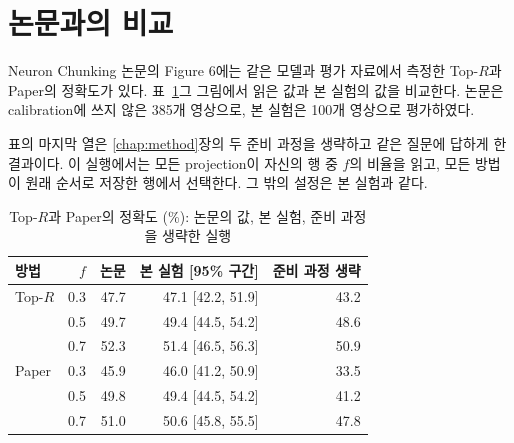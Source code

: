 
\section{논문과의 비교}\label{sec:exp-paper}

Neuron Chunking 논문의 Figure 6에는 같은 모델과 평가 자료에서 측정한 Top-$R$과 Paper의 정확도가 있다. 표~\ref{tab:paper}\는 그 그림에서 읽은 값과 본 실험의 값을 비교한다. 논문은 calibration에 쓰지 않은 385개 영상으로, 본 실험은 100개 영상으로 평가하였다.

표의 마지막 열은 \ref{chap:method}장의 두 준비 과정을 생략하고 같은 질문에 답하게 한 결과이다. 이 실행에서는 모든 projection이 자신의 행 중 $f$의 비율을 읽고, 모든 방법이 원래 순서로 저장한 행에서 선택한다. 그 밖의 설정은 본 실험과 같다.

\begin{table}[htbp]
    \centering
    \caption{Top-$R$과 Paper의 정확도 (\%): 논문의 값, 본 실험, 준비 과정을 생략한 실행}
    \label{tab:paper}
    \begin{tabular}{lrrrr}
        \toprule
        방법 & $f$ & 논문 & 본 실험 [95\% 구간] & 준비 과정 생략 \\
        \midrule
        Top-$R$ & 0.3 & 47.7 & 47.1 [42.2, 51.9] & 43.2 \\
                & 0.5 & 49.7 & 49.4 [44.5, 54.2] & 48.6 \\
                & 0.7 & 52.3 & 51.4 [46.5, 56.3] & 50.9 \\
        \midrule
        Paper & 0.3 & 45.9 & 46.0 [41.2, 50.9] & 33.5 \\
              & 0.5 & 49.8 & 49.4 [44.5, 54.2] & 41.2 \\
              & 0.7 & 51.0 & 50.6 [45.8, 55.5] & 47.8 \\
        \bottomrule
    \end{tabular}
\end{table}

